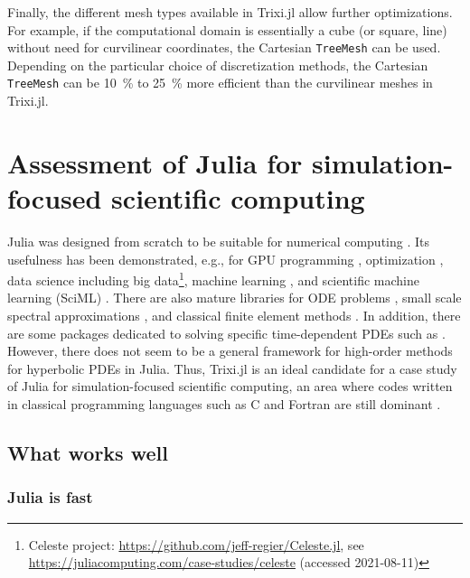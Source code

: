 \documentclass[hidelinks]{juliacon} %
\makeatletter
\newcommand{\eg}[0]{{e.g.\@}\xspace}
\newcommand{\trixi}{Trixi.jl\xspace}
\makeatother
\begin{document}
Finally, the different mesh types available in \trixi allow further optimizations.
For example, if the computational domain is essentially a cube (or square, line)
without need for curvilinear coordinates, the Cartesian \lstinline{TreeMesh} can
be used. Depending on the particular choice of discretization methods, the
Cartesian \lstinline{TreeMesh} can be \SI{10}{\percent} to \SI{25}{\percent}
more efficient than the curvilinear meshes in \trixi.

\section{Assessment of Julia for simulation-focused scientific computing}
\label{sec:assessment-of-julia}

Julia was designed from scratch to be suitable for numerical computing
\cite{bezanson2017julia}. Its usefulness has been demonstrated, \eg, for
GPU programming \cite{besard2018juliagpu, omlin2020solving},
optimization \cite{dunning2017jump}, data science including
big data\footnote{Celeste project: \url{https://github.com/jeff-regier/Celeste.jl},
see \url{https://juliacomputing.com/case-studies/celeste} (accessed 2021-08-11)},
machine learning \cite{innes2018fashionable}, and scientific machine learning
(SciML) \cite{pal2021opening}. There are also mature libraries for ODE problems
\cite{rackauckas2017differentialequations}, small scale spectral approximations
\cite{olver2014practical}, and classical finite element methods \cite{badia2020gridap}.
In addition, there are some packages dedicated to solving specific time-dependent
PDEs such as \cite{ramadhan2020oceananigans, constantinou2021geophysicalflows}.
However, there does not seem to be a general framework for high-order methods
for hyperbolic PDEs in Julia. Thus, \trixi is an ideal candidate for a case study
of Julia for simulation-focused scientific computing, an area where codes written
in classical programming languages such as C and Fortran are still dominant
\cite{krais2021flexi, parsani2021ssdc}.

\subsection{What works well}

\subsubsection{Julia is fast}
\end{document}
